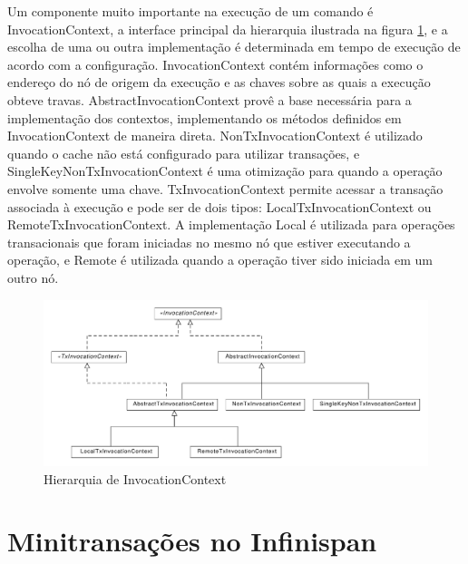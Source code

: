 \documentclass[11pt,twoside,a4paper]{book}
\begin{document}
Um componente muito importante na execução de um comando é InvocationContext, a interface principal da hierarquia ilustrada na figura \ref{fig:invocation_context}, e a escolha de uma ou outra implementação é determinada em tempo de execução de acordo com a configuração. InvocationContext contém informações como o endereço do nó de origem da execução e as chaves sobre as quais a execução obteve travas. AbstractInvocationContext provê a base necessária para a implementação dos contextos, implementando os métodos definidos em InvocationContext de maneira direta. NonTxInvocationContext é utilizado quando o cache não está configurado para utilizar transações, e SingleKeyNonTxInvocationContext é uma otimização para quando a operação envolve somente uma chave. TxInvocationContext permite acessar a transação associada à execução e pode ser de dois tipos: LocalTxInvocationContext ou RemoteTxInvocationContext. A implementação Local é utilizada para operações transacionais que foram iniciadas no mesmo nó que estiver executando a operação, e Remote é utilizada quando a operação tiver sido iniciada em um outro nó. 

\begin{figure}
  \centering
  \includegraphics[width=\textwidth]{invocation_context} 
  \caption{Hierarquia de InvocationContext}
  \label{fig:invocation_context} 
\end{figure}

\section{Minitransações no Infinispan}
\label{sec:mt_infinispan}
\end{document}
